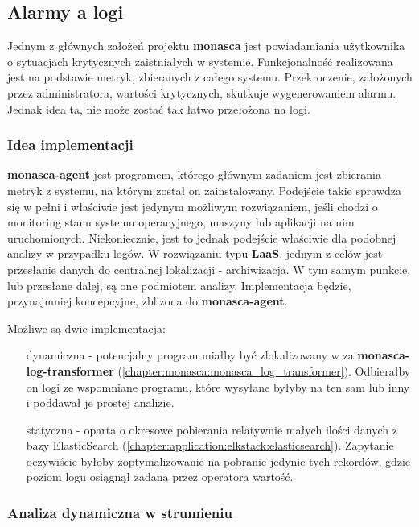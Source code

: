 \subsection{Alarmy a logi}
\label{chapter:application_own:plans:alarm_on_logs}

Jednym z głównych założeń projektu \textbf{monasca} jest powiadamiania użytkownika o 
sytuacjach krytycznych zaistniałych w systemie. Funkcjonalność realizowana jest na podstawie
metryk, zbieranych z całego systemu. Przekroczenie, założonych przez administratora, wartości
krytycznych, skutkuje wygenerowaniem alarmu. Jednak idea ta, nie może zostać
tak łatwo przełożona na logi. 

    \subsubsection{Idea implementacji}
    \textbf{monasca-agent} jest programem, którego głównym zadaniem jest zbierania metryk z systemu, na którym
    został on zainstalowany. Podejście takie sprawdza się w pełni i właściwie jest jedynym możliwym rozwiązaniem,
    jeśli chodzi o monitoring stanu systemu operacyjnego, maszyny lub aplikacji na nim uruchomionych. Niekoniecznie,
    jest to jednak podejście właściwie dla podobnej analizy w przypadku logów. W rozwiązaniu typu \textbf{LaaS}, 
    jednym z celów jest przesłanie danych do centralnej lokalizacji - archiwizacja. W tym samym punkcie, lub
    przesłane dalej, są one podmiotem analizy. Implementacja będzie, przynajmniej koncepcyjne, zbliżona do \textbf{monasca-agent}.
    
    Możliwe są dwie implementacja:
    \begin{itemize}
        \item[dynamiczna] - potencjalny program miałby być zlokalizowany w za \textbf{monasca-log-transformer} (\ref{chapter:monasca:monasca_log_transformer}).
        Odbierałby on logi ze wspomniane programu, które wysyłane byłyby na ten sam lub inny  i poddawał je prostej analizie. 
        \item[statyczna] - oparta o okresowe pobierania relatywnie małych ilości danych z bazy ElasticSearch (\ref{chapter:application:elkstack:elasticsearch}). 
        Zapytanie oczywiście byłoby zoptymalizowanie na pobranie jedynie tych rekordów, gdzie poziom logu osiągnął zadaną przez operatora wartość.
    \end{itemize}
    
    \subsubsection{Analiza dynamiczna w strumieniu}
    \label{chapter:application_own:plans:alarm_on_logs:streaming}
    
